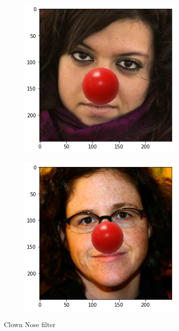\documentclass{article}
\begin{document}
\begin{figure}[h]
  \centering
  \begin{subfigure}[b]{.4\textwidth}
    \includegraphics[width=\textwidth]{nose1}
  \end{subfigure}
  \begin{subfigure}[b]{0.4\textwidth}
    \includegraphics[width=\textwidth]{nose5}
  \end{subfigure}
  \caption{Clown Nose filter}
  \label{fig:nose}
\end{figure}

\newpage


\end{document}
